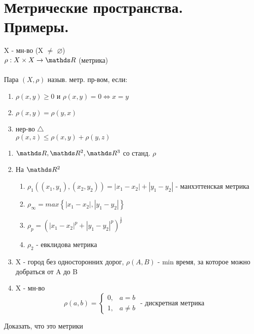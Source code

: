 \documentclass[geometry.tex]{subfiles}
\begin{document}
  \section{Метрические пространства. Примеры.}

  \begin{definition}
      X - мн-во (X $\neq$ $\varnothing$) \\
      $\rho: X \times X \rightarrow \R$ (метрика)\\ \\
      Пара $(X, \rho)$ назыв. метр. пр-вом, если:
      \begin{enumerate}
          \item $\rho(x, y) \geq 0$ и $\rho(x, y) = 0 \Leftrightarrow x = y$
          \item $\rho(x, y) = \rho(y, x)$
          \item нер-во $\bigtriangleup$ \\ $\rho(x, z) \leq \rho(x, y) + \rho(y, z)$
      \end{enumerate}
  \end{definition}

  \begin{examples}
      \begin{enumerate}
          \item $\R, \R^2, \R^3$ со станд. $\rho$
          \item На $\R^2$
          \begin{enumerate}
              \item $\rho_1((x_1, y_1), (x_2, y_2)) = |x_1 - x_2| + |y_1 - y_2|$ - манхэттенская метрика
              \item $\rho_\infty = max\left\{|x_1 - x_2|, |y_1 - y_2|\right\}$
              \item $\rho_p = (|x_1 - x_2|^p + |y_1 - y_2|^p)^{\frac{1}{p}}$
              \item $\rho_2 \text{ - евклидова метрика}$
          \end{enumerate}
          \item X - город без односторонних дорог, $\rho(A, B)$ - min время, за которое можно добраться от A до B
          \item X - мн-во\\
              \[\rho(a, b) =
              \begin{cases}
                  0, &a = b\\
                  1, &a \neq b
              \end{cases}\text{ - дискретная метрика}\]
      \end{enumerate}
  \end{examples}

  \begin{upr}
    Доказать, что это метрики
  \end{upr}
\end{document}
